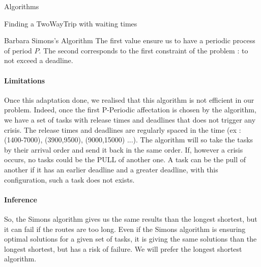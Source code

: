 \documentclass[a4paper,10pt]{report}
\begin{document}
\begin{chapter}{Algorithms}
\begin{section}{Finding a TwoWayTrip with waiting times}
\begin{subsection}{Barbara Simons's Algorithm}
The first value ensure us to have a periodic process of period $P$. The second corresponds to the first constraint of the problem : to not exceed a deadline.

\paragraph{Limitations}
Once this adaptation done, we realised that this algorithm is not efficient in our problem. Indeed, once the first P-Periodic affectation is chosen
by the algorithm, we have a set of tasks with release times and deadlines that does not trigger any crisis.
The release times and deadlines are regularly spaced in the time (ex : (1400-7000), (3900,9500), (9000,15000) ...).
The algorithm will so take the tasks by their arrival order and send it back in the same order. If, however a crisis occurs, no tasks could be the PULL
of another one. A task can be the pull of another if it has an earlier deadline and a greater deadline, with this configuration, such a task does not exists.

\paragraph{Inference}
So, the Simons algorithm gives us the same results than the longest shortest, but it can fail if the routes are too long.
Even if the Simons algorithm is ensuring optimal solutions for a given set of tasks, it is giving the same solutions than the longest shortest, but
has a risk of failure. We will prefer the longest shortest algorithm.



\end{subsection}

\end{section}

\end{chapter}
\end{document}
